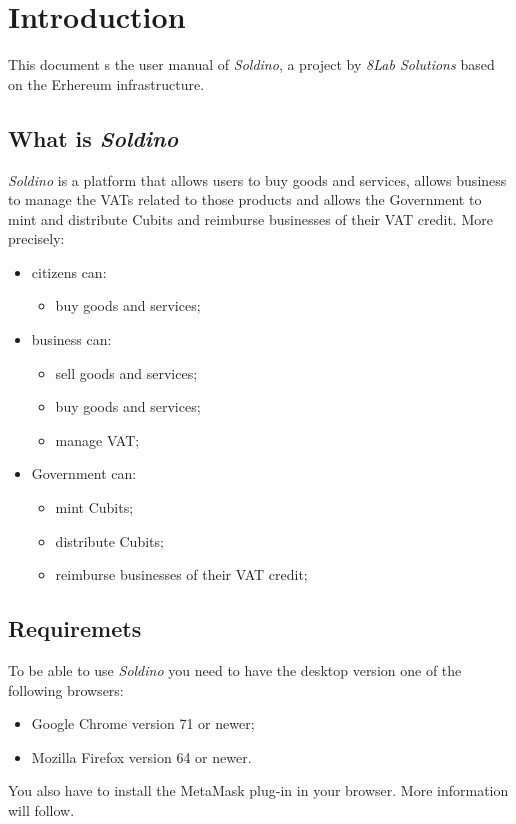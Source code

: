 \section{Introduction} 
	This document s the user manual of \textit{Soldino}, a project by 
	\textit{8Lab Solutions} based on the Erhereum infrastructure. 
	\subsection{What is \textit{Soldino}}
	\textit{Soldino} is a platform that allows 
	users to buy goods and services, allows business to manage the VATs 
	related to those products and allows the Government to mint and distribute
	Cubits and reimburse businesses of their VAT credit.
	More precisely:
	\begin{itemize}
		\item citizens can:
		\begin{itemize}
			\item  buy goods and services;
		\end{itemize}
		\item business can:
		\begin{itemize}
			\item sell goods and services;
			\item buy goods and services;
			\item manage VAT;
		\end{itemize}
		\item Government can:
		\begin{itemize}
			\item mint Cubits;
			\item distribute Cubits;
			\item reimburse businesses of their VAT credit;
		\end{itemize}
	\end{itemize}

\subsection{Requiremets}
	To be able to use \textit{Soldino} you need to have the desktop version 
	one of the following browsers:
	\begin{itemize}
		\item Google Chrome version 71 or newer;
		\item Mozilla Firefox version 64 or newer.
	\end{itemize}
	You also have to install the MetaMask plug-in in your browser. More 
	information will follow. 
